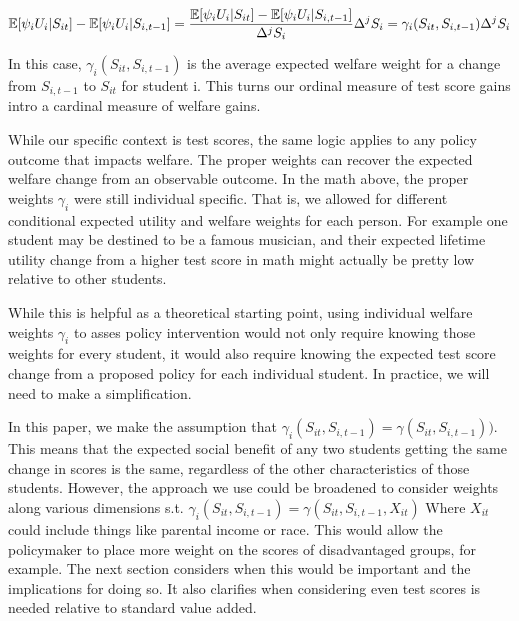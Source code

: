 \documentclass[12pt]{article}
\theoremstyle{definition}
\theoremstyle{definition}
\theoremstyle{definition}
\theoremstyle{definition}
\begin{document}
    \begin{equation}
        \mathbb{E}[\psi_i U_i|S_{it}] - \mathbb{E}[\psi_i U_i |S_{i,t-1}] =  \frac{\mathbb{E}[\psi_i U_i|S_{it}] - \mathbb{E}[\psi_i U_i |S_{i,t-1}] }{\Delta^jS_i} \Delta^jS_i = \gamma_i(S_{it}, S_{i,t-1}) \Delta^jS_i
    \end{equation}
 
    In this case, $\gamma_i(S_{it}, S_{i,t-1})$ is the average expected welfare weight for a change from $S_{i,t-1}$ to $S_{it}$ for student i. This turns our ordinal measure of test score gains intro a cardinal measure of welfare gains. 
 

    While our specific context is test scores, the same logic applies to any policy outcome that impacts welfare. The proper weights can recover the expected welfare change from an observable outcome. In the math above, the proper weights  $\gamma_i$ were still individual specific. That is, we allowed for different conditional expected utility and welfare weights for each person. For example one student may be destined to be a famous musician, and their expected lifetime utility change from a higher test score in math might actually be pretty low relative to other students. 
    
    While this is helpful as a theoretical starting point, using individual welfare weights  $\gamma_i$ to asses policy intervention would not only require knowing those weights for every student, it would also require knowing the expected test score change from a proposed policy for each individual student. In practice, we will need to make a simplification.
    
    In this paper, we make the assumption that $\gamma_i(S_{it}, S_{i,t-1}) = \gamma(S_{it}, S_{i,t-1}))$. This means that the expected social benefit of any two students getting the same change in scores is the same, regardless of the other characteristics of those students. However, the approach we use could be broadened to consider weights along various dimensions s.t. $\gamma_i(S_{it}, S_{i,t-1}) = \gamma(S_{it}, S_{i,t-1}, X_{it})$ Where $X_{it}$ could include things like parental income or race. This would allow the policymaker to place more weight on the scores of disadvantaged groups, for example. The next section considers when this would be important and the implications for doing so. It also clarifies when considering even test scores is needed relative to standard value added. 
    

    
\end{document}
